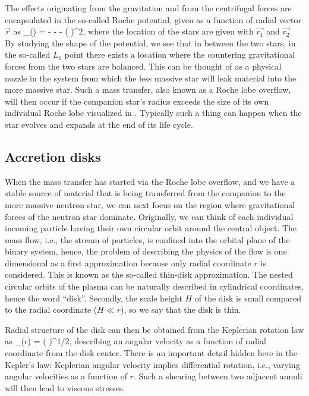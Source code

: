 The effects originating from the gravitation and from the centrifugal forces are encapsulated in the so-called Roche potential, given as a function of radial vector $\vec{r}$ as\cite[see e.g.,][]{PRP02, LL15}
\be
\Phi_{}() = - - -  ( \vec{ \omega } \times {} )^2,
\ee
where the location of the stars are given with $\vec{r_1}$ and $\vec{r_2}$.
By studying the shape of the potential, we see that in between the two stars, in the so-called $L_1$ point there exists a location where the countering gravitational forces from the two stars are balanced.
This can be thought of as a physical nozzle in the system from which the less massive star will leak material into the more massive star.
Such a mass transfer, also known as a Roche lobe overflow, will then occur if the companion star's radius exceeds the size of its own individual Roche lobe visualized in .
Typically such a thing can happen when the star evolves and expands at the end of its life cycle. 


\subsection{Accretion disks}

When the mass transfer has started via the Roche lobe overflow, and we have a stable source of material that is being transferred from the companion to the more massive neutron star, we can next focus on the region where gravitational forces of the neutron star dominate.
Originally, we can think of each individual incoming particle having their own circular orbit around the central object.
The mass flow, i.e., the stream of particles, is confined into the orbital plane of the binary system, hence, the problem of describing the physics of the flow is one dimensional as a first approximation because only radial coordinate $r$ is considered.
This is known as the so-called thin-disk approximation.
The nested circular orbits of the plasma can be naturally described in cylindrical coordinates, hence the word ``disk''.
Secondly, the scale height $H$ of the disk is small compared to the radial coordinate ($H \ll r$), so we say that the disk is thin.

Radial structure of the disk can then be obtained from the Keplerian rotation law as
\be
\Omega_{}(r) = \left(  \right)^{1/2},
\ee
describing an angular velocity as a function of radial coordinate from the disk center.
There is an important detail hidden here in the Kepler's law:
Keplerian angular velocity implies differential rotation, i.e., varying angular velocities as a function of $r$.
Such a shearing between two adjacent annuli will then lead to viscous stresses. %

